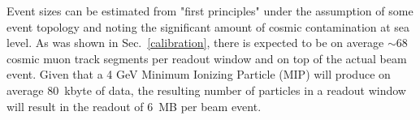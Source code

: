 Event sizes can be estimated from "first principles" under the assumption of some event topology and noting the significant amount of cosmic contamination at sea level.  As was shown in Sec.~\ref{calibration}, there is expected to be on average $\sim$68 cosmic muon track segments per readout window and on top of the actual beam event.  Given that a 4 GeV Minimum Ionizing Particle (MIP) will produce on average 80~kbyte of data, the resulting number of particles in a readout window will result in the readout of 6~MB per beam event.  
%







